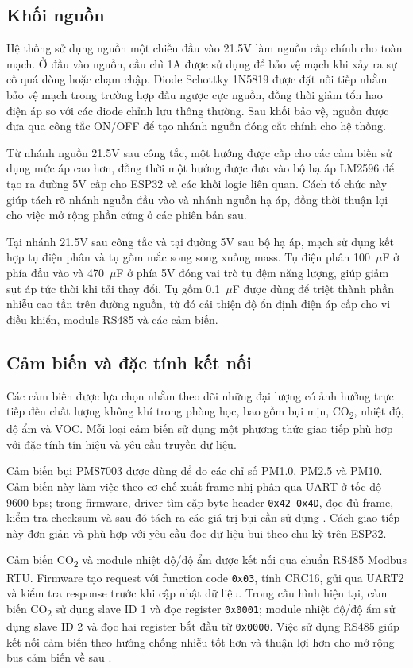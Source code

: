 \subsection{Khối nguồn}

Hệ thống sử dụng nguồn một chiều đầu vào 21.5V làm nguồn cấp chính cho toàn mạch. Ở đầu
vào nguồn, cầu chì 1A được sử dụng để bảo vệ mạch khi xảy ra sự cố quá dòng hoặc chạm
chập. Diode Schottky 1N5819 được đặt nối tiếp nhằm bảo vệ mạch trong trường hợp đấu
ngược cực nguồn, đồng thời giảm tổn hao điện áp so với các diode chỉnh lưu thông thường.
Sau khối bảo vệ, nguồn được đưa qua công tắc ON/OFF để tạo nhánh nguồn đóng cắt chính
cho hệ thống.

Từ nhánh nguồn 21.5V sau công tắc, một hướng được cấp cho các cảm biến sử dụng mức áp
cao hơn, đồng thời một hướng được đưa vào bộ hạ áp LM2596 để tạo ra đường 5V cấp cho
ESP32 và các khối logic liên quan. Cách tổ chức này giúp tách rõ nhánh nguồn đầu vào và
nhánh nguồn hạ áp, đồng thời thuận lợi cho việc mở rộng phần cứng ở các phiên bản sau.

Tại nhánh 21.5V sau công tắc và tại đường 5V sau bộ hạ áp, mạch sử dụng kết hợp tụ
điện phân và tụ gốm mắc song song xuống mass. Tụ điện phân 100~$\mu$F ở phía đầu vào và
470~$\mu$F ở phía 5V đóng vai trò tụ đệm năng lượng, giúp giảm sụt áp tức thời khi tải
thay đổi. Tụ gốm 0.1~$\mu$F được dùng để triệt thành phần nhiễu cao tần trên đường
nguồn, từ đó cải thiện độ ổn định điện áp cấp cho vi điều khiển, module RS485 và các
cảm biến.

\subsection{Cảm biến và đặc tính kết nối}

Các cảm biến được lựa chọn nhằm theo dõi những đại lượng có ảnh hưởng trực tiếp đến chất
lượng không khí trong phòng học, bao gồm bụi mịn, CO\textsubscript{2}, nhiệt độ, độ ẩm
và VOC. Mỗi loại cảm biến sử dụng một phương thức giao tiếp phù hợp với đặc tính tín
hiệu và yêu cầu truyền dữ liệu.

Cảm biến bụi PMS7003 được dùng để đo các chỉ số PM1.0, PM2.5 và PM10. Cảm biến này làm
việc theo cơ chế xuất frame nhị phân qua UART ở tốc độ 9600 bps; trong firmware, driver
tìm cặp byte header \texttt{0x42 0x4D}, đọc đủ frame, kiểm tra checksum và sau đó tách
ra các giá trị bụi cần sử dụng \cite{pms7003}. Cách giao tiếp này đơn giản và phù hợp
với yêu cầu đọc dữ liệu bụi theo chu kỳ trên ESP32.

Cảm biến CO\textsubscript{2} và module nhiệt độ/độ ẩm được kết nối qua chuẩn RS485
Modbus RTU. Firmware tạo request với function code \texttt{0x03}, tính CRC16, gửi qua
UART2 và kiểm tra response trước khi cập nhật dữ liệu. Trong cấu hình hiện tại, cảm biến
CO\textsubscript{2} sử dụng slave ID 1 và đọc register \texttt{0x0001}; module nhiệt
độ/độ ẩm sử dụng slave ID 2 và đọc hai register bắt đầu từ \texttt{0x0000}. Việc sử
dụng RS485 giúp kết nối cảm biến theo hướng chống nhiễu tốt hơn và thuận lợi hơn cho mở
rộng bus cảm biến về sau \cite{modbus}.

